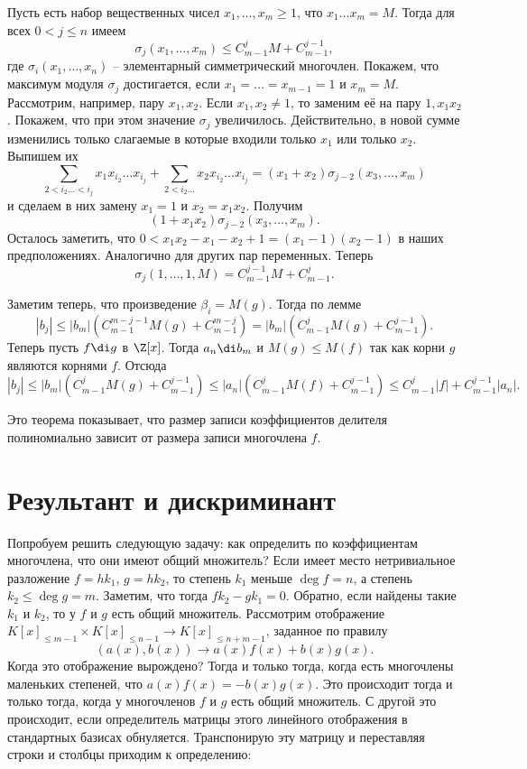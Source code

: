 \lm Пусть есть набор вещественных чисел $x_1,\dots,x_m\geq 1$, что $x_1\dots x_m=M$. Тогда для всех $0<j\leq n$ имеем $$\sigma_j(x_1,\dots,x_m) \leq C_{m-1}^j M+ C_{m-1}^{j-1},$$
где $\sigma_i(x_1,\dots,x_n)$ -- элементарный симметрический многочлен.
\proof Покажем, что максимум модуля $\sigma_j$ достигается, если $x_1=\dots=x_{m-1}=1$ и $x_m=M$. Рассмотрим, например, пару $x_1,x_2$. Если $x_1,x_2\neq 1$, то заменим её на пару $1,x_1x_2$. Покажем, что при этом значение $\sigma_j$ увеличилось. Действительно, в новой сумме изменились только слагаемые в которые входили только $x_1$ или только $x_2$. Выпишем их 
$$\sum_{2<i_2 \dots< i_j} x_1 x_{i_2}\dots x_{i_j}  + \sum_{2<i_2\dots} x_2 x_{i_2}\dots x_{i_j}= (x_1+x_2)\sigma_{j-2}(x_3,\dots,x_m)$$
и сделаем в них замену $x_1=1$ и $x_2=x_1x_2$. Получим
$$(1+x_1x_2)\sigma_{j-2}(x_3,\dots,x_m).$$
Осталось заметить, что $0< x_1x_2 -x_1 -x_2 + 1= (x_1-1)(x_2-1)$ в наших предположениях. Аналогично для других пар переменных.
Теперь 
$$\sigma_j(1,\dots,1,M)= C_{m-1}^{j-1}M + C_{m-1}^j.$$
\endproof
\elm

\noindent Заметим теперь, что произведение $\beta_i = M(g)$. Тогда по лемме
$$|b_j|\leq |b_m| (C_{m-1}^{m-j-1}M(g) + C_{m-1}^{m-j})=|b_m| (C_{m-1}^{j}M(g) + C_{m-1}^{j-1}).$$
Теперь пусть $f \di g $ в $\Z[x]$. Тогда $a_n \di b_m$ и $M(g)\leq M(f)$ так как корни $g$ являются корнями $f$. Отсюда
$$|b_j|\leq |b_m| (C_{m-1}^{j}M(g) + C_{m-1}^{j-1})\leq |a_n|(C_{m-1}^{j}M(f) + C_{m-1}^{j-1})\leq C_{m-1}^{j}|f| + C_{m-1}^{j-1}|a_n|.$$

\endproof
\ethrm



Это теорема показывает, что размер записи коэффициентов делителя полиномиально зависит от размера записи многочлена $f$.







\section{Результант и дискриминант}

Попробуем решить следующую задачу: как определить по коэффициентам многочлена, что они имеют общий множитель? Если имеет место нетривиальное разложение $f=hk_1$, $g=hk_2$, то степень $k_1$ меньше $\deg f=n$, а степень $k_2\leq \deg g=m$. Заметим, что тогда $fk_2-gk_1=0$. Обратно, если найдены такие $k_1$ и $k_2$, то у $f$ и $g$ есть общий множитель. Рассмотрим отображение $K[x]_{\leq m-1}\times K[x]_{\leq n-1} \to K[x]_{\leq n+m-1}$, заданное по правилу
$$(a(x),b(x)) \to a(x)f(x)+b(x)g(x).$$ 
Когда это отображение вырождено? Тогда и только тогда, когда есть многочлены маленьких степеней, что $a(x)f(x)=-b(x)g(x)$. Это происходит тогда и только тогда, когда у многочленов $f$ и $g$ есть общий множитель. С другой это происходит, если определитель матрицы этого линейного отображения в стандартных базисах обнуляется. Транспонирую эту матрицу и переставляя строки и столбцы приходим к определению:


